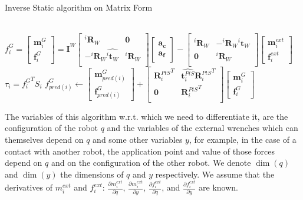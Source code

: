 \begin{algorithm}
  \caption{Inverse Static algorithm on Matrix Form}
\label{alg:ISmatrix}
\begin{algorithmic}
  \\
  $f^G_i =
  \begin{bmatrix}
    \mathbf{m}^{G}_i \\ \mathbf{f}^{G}_i
  \end{bmatrix}
  =
  \mathbf{I}^W
  \begin{bmatrix}
    {{}^i\mathbf{R}_W} & \mathbf{0} \\
    -{{}^i\mathbf{R}_W}\widehat{{}^i\mathbf{t}_W} & {{}^i\mathbf{R}_W} \\
  \end{bmatrix}
  \begin{bmatrix}
    \mathbf{a_c} \\ \mathbf{a_f}
  \end{bmatrix}
  -
  \begin{bmatrix}
    {{}^i\mathbf{R}_W} & -{{}^i\mathbf{R}_W}\widehat{{}^i\mathbf{t}_W} \\
    \mathbf{0} & {{}^i\mathbf{R}_W} \\
  \end{bmatrix}
  \begin{bmatrix}
    \mathbf{m}^{ext}_i \\ \mathbf{f}^{ext}_i
  \end{bmatrix}
  $
  \EndFor{}
  \State$\tau_i = {f^G_i}^T S_i$
  \State$f^G_{pred(i)} \leftarrow
  \begin{bmatrix}
    \mathbf{m}^{G}_{pred(i)} \\ \mathbf{f}^{G}_{pred(i)}
  \end{bmatrix}
  +
  \begin{bmatrix}
    {\mathbf{R}^{PtS}_i}^T & \widehat{\mathbf{t}^{PtS}_i}{\mathbf{R}^{PtS}_i}^T \\
    \mathbf{0} & {\mathbf{R}^{PtS}_i}^T \\
  \end{bmatrix}
  \begin{bmatrix}
    \mathbf{m}^{G}_i \\ \mathbf{f}^{G}_i
  \end{bmatrix}
  $
  \EndIf{}
  \EndFor{}
\end{algorithmic}
\end{algorithm}

The variables of this algorithm w.r.t. which we need to differentiate it, are the configuration of the robot $q$ and the variables of the external wrenches which can themselves depend on $q$ and some other variables $y$, for example, in the case of a contact with another robot, the application point and value of those forces depend on $q$ and on the configuration of the other robot.
We denote $\dim(q)$ and $\dim(y)$ the dimensions of $q$ and $y$ respectively.
We assume that the derivatives of $m_i^{ext}$ and $f_i^{ext}$: $\frac{\partial m_i^{ext}}{\partial q}$, $\frac{\partial m_i^{ext}}{\partial y}$, $\frac{\partial f_i^{ext}}{\partial q}$, and $\frac{\partial f_i^{ext}}{\partial y}$ are known.

